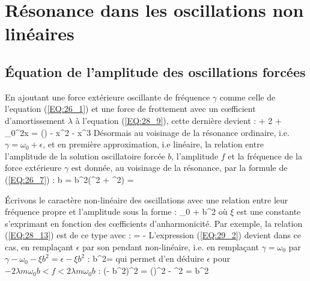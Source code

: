 \section{R\'{e}sonance dans les oscillations non lin\'{e}aires}\label{PAR:29}

\subsection{\'{E}quation de l'amplitude des oscillations forc\'{e}es}

En ajoutant une force ext\'{e}rieure oscillante de fr\'{e}quence $\gamma$ comme celle de l'{e}quation (\ref{EQ:26_1}) et une force de frottement avec un c{\oe}fficient d'amortissement $\lambda$ \`{a} l'{e}quation (\ref{EQ:28_9}), cette derni\`{e}re devient :
\be
	 + 2\lambda{} + \omega_{0}^{2}x = \cos(\gamma{}) - \alpha x^{2} - \beta x^{3} \label{EQ:29_1}
\ee
D\'{e}sormais au voisinage de la r\'{e}sonance ordinaire, i.e. $\gamma = \omega_{0} + \epsilon$, et en premi\`{e}re approximation, i.e lin\'{e}aire, la relation entre l'amplitude de la solution oscillatoire forc\'{e}e $b$, l'amplitude $f$ et la fr\'{e}quence de la force ext\'{e}rieure $\gamma$ est donn\'{e}e, au voisinage de la r\'{e}sonance, par la formule de (\ref{EQ:26_7}) :
\be
	b =  \Leftrightarrow b^{2}(\epsilon^{2} + \lambda^{2}) =  \label{EQ:29_2}
\ee

\'{E}crivons le caract\`{e}re non-lin\'{e}aire des oscillations avec une relation entre leur fr\'{e}quence propre et l'amplitude sous la forme :
\be
	\omega_{0} + \xi b^{2} \label{EQ:29_3}
\ee
o\`{u} $\xi$ est une constante s'exprimant en fonction des c{\oe}fficients d'anharmonicit\'{e}. Par exemple, la relation (\ref{EQ:28_13}) est de ce type avec :
\benn
	\xi =  - 
\eenn
L'expression (\ref{EQ:29_2}) devient dans ce cas, en rempla\c{c}ant $\epsilon$ par son pendant non-lin\'{e}aire, i.e. en rempla\c{c}ant $\gamma = \omega_{0}$ par $\gamma - \omega_{0} - \xi b^{2} = \epsilon - \xi b^{2}$ :
\be
	b^{2} =  \label{EQ:29_4}
\ee
qui permet d'en d\'{e}duire $\epsilon$ pour $-2\lambda m\omega_{0}b < f < 2\lambda m\omega_{0}b$ :
\benn
	(\epsilon - \xi b^{2})^{2} = \left(\right)^{2} - \lambda^{2} \Leftrightarrow \epsilon = \xi b^{2} \pm {}
\eenn

